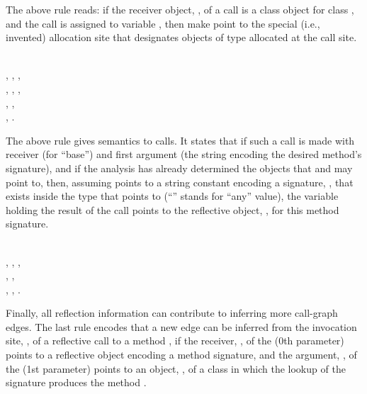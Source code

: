 \noindent The above rule reads: if the receiver object, , of a
 call is a class object for class , and the
 call is assigned to variable , then make
 point to the special (i.e., invented) allocation site  that designates
objects of type  allocated at the  call site.

\begin{rules}
  \\
\tab {}, , , \\
\tab {}, , ,\\
\tab {}, , \\ %
\tab {}, .\\ %
\end{rules}

\noindent The above rule gives semantics to  calls.  It
states that if such a call is made with receiver  (for
``base'') and first argument  (the string encoding the desired
method's signature), and if the analysis has already determined the
objects that  and  may point to, then, assuming
 points to a string constant encoding a signature, ,
that exists inside the type that  points to (``\args{\_}''
stands for ``any'' value), the variable  holding the result of the
 call points to the reflective object,
, for this method signature.

\begin{rules}
  \\
\tab {}, , , \\
\tab {}, , \\
\tab {}, , .\\
\end{rules}

\noindent Finally, all reflection information can contribute to inferring more
call-graph edges. The last rule encodes that a new edge can be
inferred from the invocation site, , of a reflective  call to a
method , if the receiver, , of the  (0th parameter) points to a
reflective object encoding a method signature, and the argument,
, of the  (1st parameter) points to an object,
, of a class in which the lookup of the signature produces
the method .

